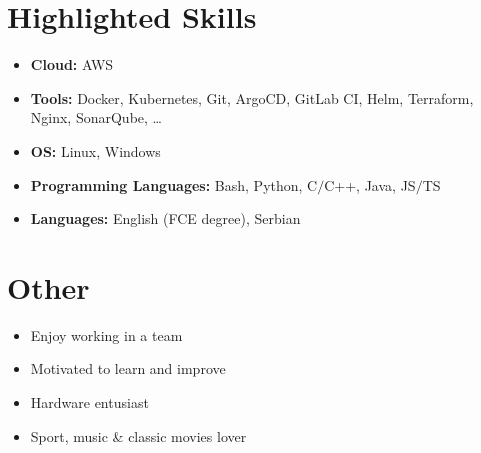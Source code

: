 \documentclass[a4paper]{moderncv}
\begin{document}
\section{Highlighted Skills}

	\begin{itemize}
		
		\item \textbf{Cloud: } AWS
		\item \textbf{Tools: } Docker, Kubernetes, Git, ArgoCD, GitLab CI, Helm, Terraform, Nginx, SonarQube, \dots
		\item \textbf{OS: } Linux, Windows
		\item \textbf{Programming Languages: } Bash, Python, C$\slash$C++, Java, JS$\slash$TS
		\item \textbf{Languages: } English (FCE degree), Serbian
		
	\end{itemize}
%
%
\section{Other}
	\vspace{-1em}
	\begin{multicols*}{2}
		\begin{itemize}
			\setlength\itemsep{-1.2pt}
			\item Enjoy working in a team
			\item Motivated to learn and improve
			\item Hardware entusiast			
			\item Sport, music \& classic movies lover
		\end{itemize}		
	\end{multicols*}

\end{document}
